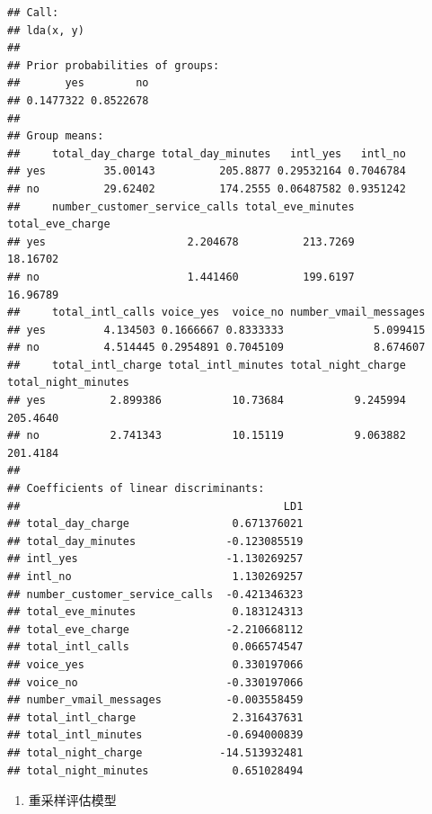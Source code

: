 \documentclass[
]{article}
\newenvironment{Shaded}{\begin{snugshade}}{\end{snugshade}}
\newcommand{\KeywordTok}[1]{\textcolor[rgb]{0.13,0.29,0.53}{\textbf{#1}}}
\newcommand{\NormalTok}[1]{#1}
\newcommand{\OperatorTok}[1]{\textcolor[rgb]{0.81,0.36,0.00}{\textbf{#1}}}
\newcommand{\StringTok}[1]{\textcolor[rgb]{0.31,0.60,0.02}{#1}}
\providecommand{\tightlist}{%
  \setlength{\itemsep}{0pt}\setlength{\parskip}{0pt}}
\begin{document}
\begin{verbatim}
## Call:
## lda(x, y)
## 
## Prior probabilities of groups:
##       yes        no 
## 0.1477322 0.8522678 
## 
## Group means:
##     total_day_charge total_day_minutes   intl_yes   intl_no
## yes         35.00143          205.8877 0.29532164 0.7046784
## no          29.62402          174.2555 0.06487582 0.9351242
##     number_customer_service_calls total_eve_minutes total_eve_charge
## yes                      2.204678          213.7269         18.16702
## no                       1.441460          199.6197         16.96789
##     total_intl_calls voice_yes  voice_no number_vmail_messages
## yes         4.134503 0.1666667 0.8333333              5.099415
## no          4.514445 0.2954891 0.7045109              8.674607
##     total_intl_charge total_intl_minutes total_night_charge total_night_minutes
## yes          2.899386           10.73684           9.245994            205.4640
## no           2.741343           10.15119           9.063882            201.4184
## 
## Coefficients of linear discriminants:
##                                         LD1
## total_day_charge                0.671376021
## total_day_minutes              -0.123085519
## intl_yes                       -1.130269257
## intl_no                         1.130269257
## number_customer_service_calls  -0.421346323
## total_eve_minutes               0.183124313
## total_eve_charge               -2.210668112
## total_intl_calls                0.066574547
## voice_yes                       0.330197066
## voice_no                       -0.330197066
## number_vmail_messages          -0.003558459
## total_intl_charge               2.316437631
## total_intl_minutes             -0.694000839
## total_night_charge            -14.513932481
## total_night_minutes             0.651028494
\end{verbatim}

\begin{enumerate}
\def\labelenumi{\arabic{enumi}.}
\setcounter{enumi}{11}
\tightlist
\item
  重采样评估模型
\end{enumerate}

\begin{Shaded}
\end{Shaded}
\end{document}
